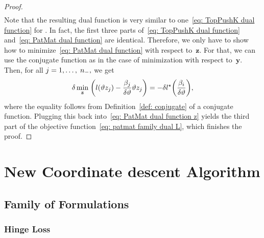 \begin{proof}
\begin{subequations}
\begin{align}
    \end{align}
  \end{subequations}
  Note that the resulting dual function is very similar to one~\eqref{eq: TopPushK dual function} for \TopPushK. In fact, the first three parts of~\eqref{eq: TopPushK dual function} and~\eqref{eq: PatMat dual function} are identical. Therefore, we only have to show how to minimize~\eqref{eq: PatMat dual function} with respect to~$\bm{z}.$ For that, we can use the conjugate function as in the case of minimization with respect to~$\bm{y}.$ Then, for all $j = 1, \ldots, \; n_{-},$ we get 
  \begin{equation*}
    \delta \min_{\bm{z}} \; \Brac{l(\vartheta z_j) - \frac{\beta_j}{\delta\vartheta } \vartheta z_j} = - \delta l^{\star} \Brac{\frac{\beta_i}{\delta\vartheta }},
  \end{equation*}
  where the equality follows from Definition~\ref{def: conjugate} of a conjugate function. Plugging this back into~\eqref{eq: PatMat dual function z} yields the third part of the objective function~\eqref{eq: patmat family dual L}, which finishes the proof.
\end{proof}

\section{New Coordinate descent Algorithm}
\subsection{Family of \TopPushK Formulations}\label{sec: toppushk family coordinate proofs}
\subsubsection{Hinge Loss}

